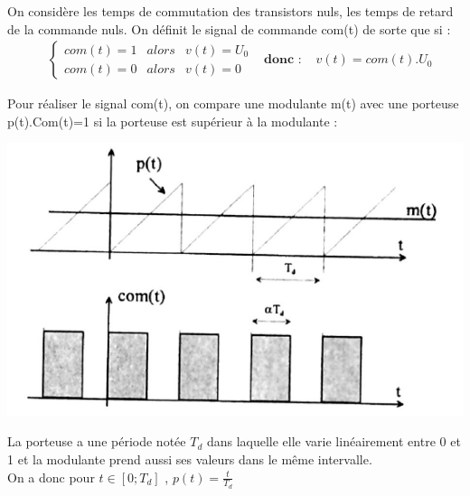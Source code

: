 \documentclass[10pt,a4paper]{article}
\begin{document}
	On considère les temps de commutation des transistors nuls, les temps de retard de la commande nuls. On définit le signal de commande com(t) de sorte que si :
	\begin{align} &\left \{\begin{matrix}
	 com(t) = 1 & alors& v(t) = U_0\\com(t) = 0 & alors& v(t) = 0
	\end{matrix}\right. &\textbf{donc : 	}&v(t) = com(t).U_0
	\end{align}

Pour réaliser le signal com(t), on compare une modulante m(t) avec une porteuse p(t).Com(t)=1 si la porteuse est supérieur à la modulante : 

\begin{center}
\includegraphics[scale=0.3]{enonce1.png}
\end{center}
	
La porteuse a une période notée $T_d$ dans laquelle elle varie linéairement entre 0 et 1 et la modulante prend aussi ses valeurs dans le même intervalle.\\
On a donc pour $t \in [0;T_d]$ , $p(t) = \frac{t}{T_d}$\\
\end{document}
